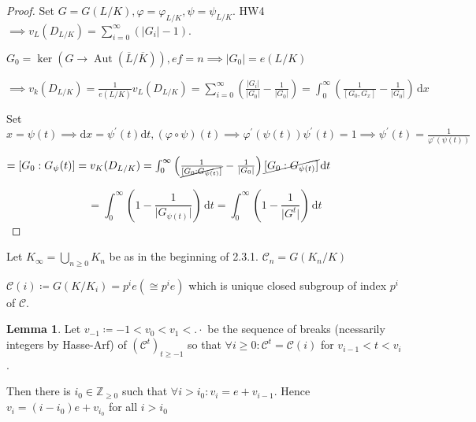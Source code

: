 \documentclass{article}
\theoremstyle{definition}
\numberwithin{theorem}{subsection}
\newtheorem{lemma}[theorem]{Lemma}
\begin{document}
    \begin{proof}
        Set \(G = G(L / K), \varphi = \varphi_{L / K}, \psi = \psi_{L / K}\). HW4 \(\implies v_L(D_{L / K}) =  \sum_{i=0}^{\infty} (\vert G_i \vert - 1)\).
        
        \(G_0 = \ker (G \to \operatorname{Aut} (\overline{L} / \overline{K})), ef=n \implies \vert G_0 \vert = e(L / K)\) 

        \(\implies v_k(D_{L / K}) = \frac{1}{e(L / K)} v_L(D_{L / K}) = \sum_{i=0}^{\infty} \left( \frac{\vert G_i \vert}{\vert G_0 \vert } - \frac{1}{\vert G_0 \vert } \right) = \int_{0}^{\infty} \left( \frac{1}{[G_0, G_x]} - \frac{1}{\vert G_0 \vert } \right)  \,\mathrm{d}x \) 

        Set \(x = \psi (t) \implies \mathrm{d} x = \psi ^{\prime} (t) \mathrm{d} t, (\varphi \circ  \psi)(t) \implies \varphi^{\prime}(\psi(t)) \psi ^{\prime} (t) = 1 \implies \psi ^{\prime} (t) = \frac{1}{\varphi ^{\prime} (\psi (t))}\)
        
        \(= [G_0 : G_{\psi}(t)] = v_K(D_{L / K}) = \int_{0}^{\infty} \left( \frac{1}{\cancel{[G_0 : G_{\psi(t)}]}} - \frac{1}{\vert G_0 \vert} \right) \cancel{[G_0: G_{\psi(t)}]}  \,\mathrm{d}t \) 

        \[
            = \int_{0}^{\infty} \left( 1 - \frac{1}{\vert G_{\psi(t)} \vert } \right)  \,\mathrm{d}t = \int_{0}^{\infty} \left( 1 - \frac{1}{\vert G^t \vert } \right)  \,\mathrm{d}t 
        \]
    \end{proof}

    Let \(K_\infty = \bigcup_{n \geq 0} K_n\) be as in the beginning of 2.3.1.  \(\mathscr{C}_n = G(K_n / K)\)
    
    \(\mathscr{C}(i) \coloneqq G(K / K_i) = p^i e (\cong p^i e)\) which is unique closed subgroup of index \(p^i\) of \(\mathscr{C}\).

    \begin{lemma}
        Let \(v_{-1} \coloneqq -1 < v_0 < v_1 < .\cdot\) be the sequence of breaks (ncessarily integers by Hasse-Arf) of \((\mathscr{C}^t)_{t\geq -1}\) so that \(\forall i \geq 0: \mathscr{C}^t = \mathscr{C}(i)\) for \(v_{i-1} < t < v_i\).

        Then there is \(i_0 \in \mathbb{Z}_{\geq 0}\) such that \(\forall i > i_0: v_i = e+v_{i-1}\). Hence \(v_i = (i-i_0)e + v_{i_0}\) for all \(i > i_0\) 
    \end{lemma}
\end{document}
